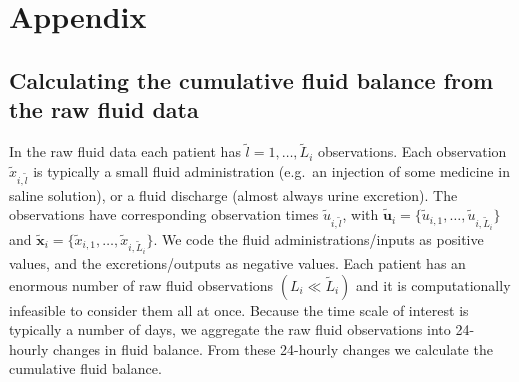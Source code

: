\documentclass[
  10pt,
  a4paper,
]{article}
\begin{document}
\renewcommand{\thesubsection}{\Alph{subsection}}

\hypertarget{appendix}{%
\section*{Appendix}\label{appendix}}

\hypertarget{calculating-the-cumulative-fluid-balance-from-the-raw-fluid-data}{%
\subsection{Calculating the cumulative fluid balance from the raw fluid
data}\label{calculating-the-cumulative-fluid-balance-from-the-raw-fluid-data}}

In the raw fluid data each patient has
\(\tilde{l} = 1, \ldots, \tilde{L}_{i}\) observations. Each observation
\(\tilde{x}_{i, \tilde{l}}\) is typically a small fluid administration
(e.g.~an injection of some medicine in saline solution), or a fluid
discharge (almost always urine excretion). The observations have
corresponding observation times \(\tilde{u}_{i, \tilde{l}}\), with
\(\tilde{\boldsymbol{u}}_{i} = \{\tilde{u}_{i, 1}, \ldots, \tilde{u}_{i, \tilde{L}_{i}}\}\)
and
\(\tilde{\boldsymbol{x}}_{i} = \{\tilde{x}_{i, 1}, \ldots, \tilde{x}_{i, \tilde{L}_{i}}\}\).
We code the fluid administrations/inputs as positive values, and the
excretions/outputs as negative values. Each patient has an enormous
number of raw fluid observations \((L_{i} \ll \tilde{L}_{i})\) and it is
computationally infeasible to consider them all at once. Because the
time scale of interest is typically a number of days, we aggregate the
raw fluid observations into 24-hourly changes in fluid balance. From
these 24-hourly changes we calculate the cumulative fluid balance.
\end{document}
